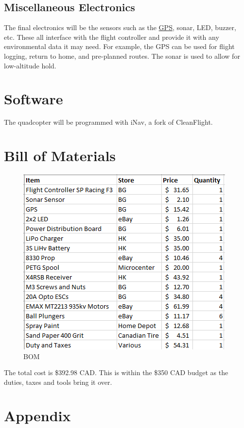 \documentclass[12pt]{article}
\begin{document}
\subsection{Miscellaneous Electronics}
The final electronics will be the sensors such as the \href{https://www.banggood.com/NZ-GPS-For-NAZE32-Flip32-6dof-10dof-Best-For-QAV250-ZMR250-Multicopter-Quadcopter-p-1015134.html}{\color{cyan}GPS}, sonar, LED, buzzer, etc. These all interface with the flight controller and provide it with any environmental data it may need. For example, the GPS can be used for flight logging, return to home, and pre-planned routes. The sonar is used to allow for low-altitude hold. 

\section{Software}
The quadcopter will be programmed with iNav, a fork of CleanFlight.

\section{Bill of Materials}
\begin{figure}[h]
\caption{BOM}
\centering
\includegraphics{bom.png}
\end{figure}

The total cost is \$392.98 CAD. This is within the \$350 CAD budget as the duties, taxes and tools bring it over.

\section{Appendix}
\end{document}
